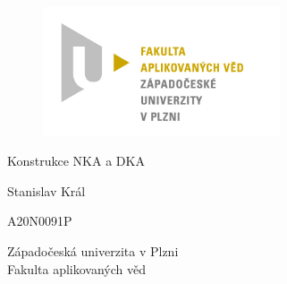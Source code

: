 \documentclass[12pt, a4paper]{article}
\begin{document}
	\renewcommand{\lstlistingname}{Ukázka kódu}
	\renewcommand{\lstlistlistingname}{Seznam ukázek kódu}
    \begin{titlepage}

       \centering

       \vspace*{\baselineskip}

       \begin{figure}[H]
          \centering
          \includegraphics[width=7cm]{img/fav-logo.jpg}
       \end{figure}



       \vspace{0.75\baselineskip}

       {\LARGE\sc Konstrukce NKA a DKA\\}

       \vspace{4\baselineskip}
       
		\vspace{0.5\baselineskip}

       
       {\sc\Large Stanislav Král \\}

       \vspace{0.5\baselineskip}

       {A20N0091P}

       \vfill

       {\sc Západočeská univerzita v Plzni\\
       Fakulta aplikovaných věd}


    \end{titlepage}


\end{document}
